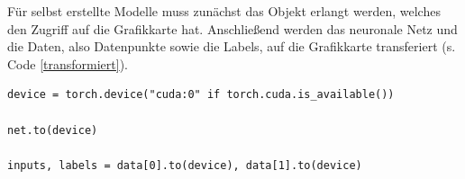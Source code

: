 Für selbst erstellte Modelle muss zunächst das Objekt erlangt werden, welches den Zugriff auf die Grafikkarte hat. Anschließend werden das neuronale Netz und die Daten, also Datenpunkte sowie die Labels, auf die Grafikkarte transferiert (s. Code \ref{transformiert}). 


\begin{lstlisting}[caption={Die Daten und das Modell werden auf die Grafikkarte übertragen, um dort ausgeführt werden zu können\cite{Subramanian2018}.}, label=transformiert]
device = torch.device("cuda:0" if torch.cuda.is_available())

net.to(device)

inputs, labels = data[0].to(device), data[1].to(device)
\end{lstlisting} 

